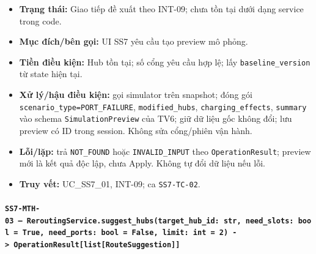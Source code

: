 \documentclass[11pt,a4paper]{article}
\providecommand{\tightlist}{%
  \setlength{\itemsep}{0pt}\setlength{\parskip}{0pt}}
\begin{document}
\begin{itemize}
\tightlist
\item
  \textbf{Trạng thái:} Giao tiếp đề xuất theo INT-09; chưa tồn tại dưới
  dạng service trong code.
\item
  \textbf{Mục đích/bên gọi:} UI SS7 yêu cầu tạo preview mô phỏng.
\item
  \textbf{Tiền điều kiện:} Hub tồn tại; số cổng yêu cầu hợp lệ; lấy
  \texttt{baseline\_version} từ state hiện tại.
\item
  \textbf{Xử lý/hậu điều kiện:} gọi simulator trên snapshot; đóng gói
  \texttt{scenario\_type=PORT\_FAILURE}, \texttt{modified\_hubs},
  \texttt{charging\_effects}, \texttt{summary} vào schema
  \texttt{SimulationPreview} của TV6; giữ dữ liệu gốc không đổi; lưu
  preview có ID trong session. Không sửa cổng/phiên vận hành.
\item
  \textbf{Lỗi/lặp:} trả \texttt{NOT\_FOUND} hoặc \texttt{INVALID\_INPUT}
  theo \texttt{OperationResult}; preview mới là kết quả độc lập, chưa
  Apply. Không tự đổi dữ liệu nếu lỗi.
\item
  \textbf{Truy vết:} UC\_SS7\_01, INT-09; ca \texttt{SS7-TC-02}.
\end{itemize}

\hypertarget{ss7-mth-03-reroutingservice.suggest_hubstarget_hub_id-str-need_slots-bool-true-need_ports-bool-false-limit-int-2---operationresultlistroutesuggestion}{%
\paragraph{\texorpdfstring{\texttt{SS7-MTH-03\ —\ ReroutingService.suggest\_hubs(target\_hub\_id:\ str,\ need\_slots:\ bool\ =\ True,\ need\_ports:\ bool\ =\ False,\ limit:\ int\ =\ 2)\ -\textgreater{}\ OperationResult{[}list{[}RouteSuggestion{]}{]}}}{SS7-MTH-03 --- ReroutingService.suggest\_hubs(target\_hub\_id: str, need\_slots: bool = True, need\_ports: bool = False, limit: int = 2) -\textgreater{} OperationResult{[}list{[}RouteSuggestion{]}{]}}}\label{ss7-mth-03-reroutingservice.suggest_hubstarget_hub_id-str-need_slots-bool-true-need_ports-bool-false-limit-int-2---operationresultlistroutesuggestion}}
\end{document}
